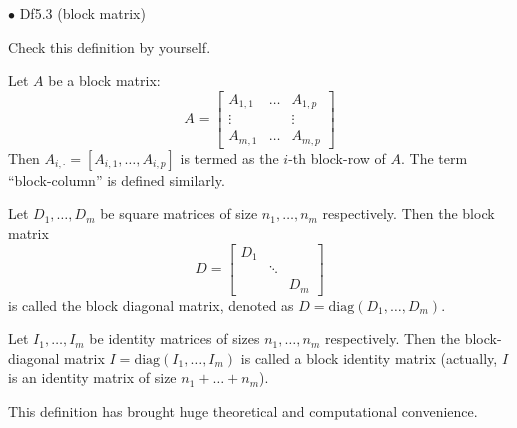 \documentclass{article}
\begin{document}
\begin{Df}{$\bullet$ Df5.3 (block matrix)}
    \begin{compactenum}
        \item Check this definition by yourself.
        \item Let $A$ be a block matrix:
            $$A = \begin{bmatrix}
                A_{1,1} & \dots & A_{1,p}\\
                \vdots  &       &\vdots\\
                A_{m,1} & \dots & A_{m,p}
            \end{bmatrix}$$
        Then $A_{i,\cdot} = [A_{i,1}, \dots, A_{i,p}]$ is termed as the $i$-th block-row of $A$. The term ``block-column'' is defined similarly.
        \item Let $D_1, \dots, D_m$ be square matrices of size $n_1, \dots, n_m$ respectively. Then the block matrix 
            $$D = \begin{bmatrix}
                D_1 &   &\\
                    & \ddots &\\
                    &   & D_m
            \end{bmatrix}$$
        is called the block diagonal matrix, denoted as $D = \text{diag}(D_1, \dots, D_m)$.
        \item Let $I_1, \dots, I_m$ be identity matrices of sizes $n_1, \dots, n_m$ respectively. Then the block-diagonal matrix $I = \text{diag}(I_1, \dots, I_m)$ is called a block identity matrix (actually, $I$ is an identity matrix of size $n_1+\dots +n_m$).
    \end{compactenum}
\end{Df}

\begin{Rmk}{}
    This definition has brought huge theoretical and computational convenience. 
\end{Rmk}
\end{document}
